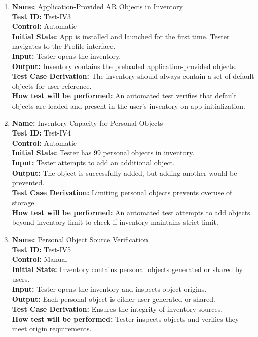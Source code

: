 \documentclass[12pt, titlepage]{article}
\begin{document}
\begin{enumerate}
  \item \textbf{Name:} Application-Provided AR Objects in Inventory \label{itm:Test-IV3} \\
  \textbf{Test ID:} Test-IV3 \\
  \textbf{Control:} Automatic \\
  \textbf{Initial State:} App is installed and launched for the first time. Tester navigates to the Profile interface. \\
  \textbf{Input:} Tester opens the inventory. \\
  \textbf{Output:} Inventory contains the preloaded application-provided objects. \\
  \textbf{Test Case Derivation:} The inventory should always contain a set of default objects for user reference. \\
  \textbf{How test will be performed:} An automated test verifies that default objects are loaded and present in the user's inventory on app initialization. \\

  \item \textbf{Name:} Inventory Capacity for Personal Objects \label{itm:Test-IV4} \\
  \textbf{Test ID:} Test-IV4 \\
  \textbf{Control:} Automatic \\
  \textbf{Initial State:} Tester has 99 personal objects in inventory. \\
  \textbf{Input:} Tester attempts to add an additional object. \\
  \textbf{Output:} The object is successfully added, but adding another would be prevented. \\
  \textbf{Test Case Derivation:} Limiting personal objects prevents overuse of storage. \\
  \textbf{How test will be performed:} An automated test attempts to add objects beyond inventory limit to check if inventory maintains strict limit. \\

  \item \textbf{Name:} Personal Object Source Verification \label{itm:Test-IV5} \\
  \textbf{Test ID:} Test-IV5 \\
  \textbf{Control:} Manual \\
  \textbf{Initial State:} Inventory contains personal objects generated or shared by users. \\
  \textbf{Input:} Tester opens the inventory and inspects object origins. \\
  \textbf{Output:} Each personal object is either user-generated or shared. \\
  \textbf{Test Case Derivation:} Ensures the integrity of inventory sources. \\
  \textbf{How test will be performed:} Tester inspects objects and verifies they meet origin requirements. \\


\end{enumerate}
\end{document}
